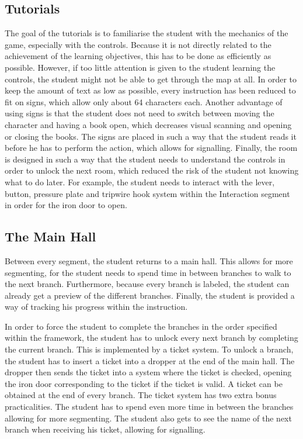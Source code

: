 \documentclass[11pt,twoside]{report} %
\begin{document}
\subsection{Tutorials}

The goal of the tutorials is to familiarise the student with the mechanics of the game, especially with the controls. Because it is not directly related to the achievement of the learning objectives, this has to be done as efficiently as possible. However, if too little attention is given to the student learning the controls, the student might not be able to get through the map at all. In order to keep the amount of text as low as possible, every instruction has been reduced to fit on signs, which allow only about 64 characters each. Another advantage of using signs is that the student does not need to switch between moving the character and having a book open, which decreases visual scanning and opening or closing the books. The signs are placed in such a way that the student reads it before he has to perform the action, which allows for signalling. Finally, the room is designed in such a way that the student needs to understand the controls in order to unlock the next room, which reduced the risk of the student not knowing what to do later. For example, the student needs to interact with the lever, button, pressure plate and tripwire hook system within the Interaction segment in order for the iron door to open.

\subsection{The Main Hall}

Between every segment, the student returns to a main hall. This allows for more segmenting, for the student needs to spend time in between branches to walk to the next branch. Furthermore, because every branch is labeled, the student can already get a preview of the different branches. Finally, the student is provided a way of tracking his progress within the instruction.

In order to force the student to complete the branches in the order specified within the framework, the student has to unlock every next branch by completing the current branch. This is implemented by a ticket system. To unlock a branch, the student has to insert a ticket into a dropper at the end of the main hall. The dropper then sends the ticket into a system where the ticket is checked, opening the iron door corresponding to the ticket if the ticket is valid. A ticket can be obtained at the end of every branch. The ticket system has two extra bonus practicalities. The student has to spend even more time in between the branches allowing for more segmenting. The student also gets to see the name of the next branch when receiving his ticket, allowing for signalling.
\end{document}
